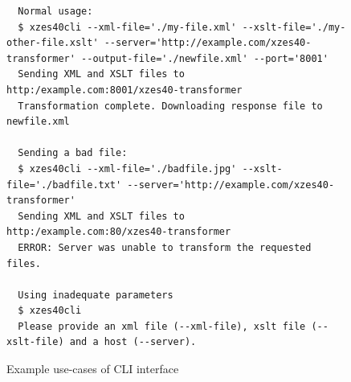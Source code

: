 \begin{figure}[h]
\centering
\caption{Example use-cases of CLI interface}
\begin{lstlisting}
  Normal usage:
  $ xzes40cli --xml-file='./my-file.xml' --xslt-file='./my-other-file.xslt' --server='http://example.com/xzes40-transformer' --output-file='./newfile.xml' --port='8001'
  Sending XML and XSLT files to http:/example.com:8001/xzes40-transformer
  Transformation complete. Downloading response file to newfile.xml

  Sending a bad file:
  $ xzes40cli --xml-file='./badfile.jpg' --xslt-file='./badfile.txt' --server='http://example.com/xzes40-transformer'
  Sending XML and XSLT files to http:/example.com:80/xzes40-transformer
  ERROR: Server was unable to transform the requested files.

  Using inadequate parameters
  $ xzes40cli
  Please provide an xml file (--xml-file), xslt file (--xslt-file) and a host (--server).
\end{lstlisting}
\end{figure}
